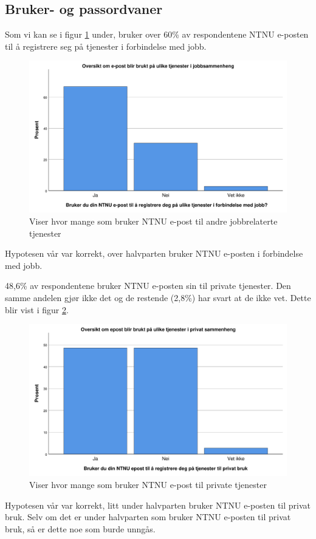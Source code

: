 \subsection{Bruker- og passordvaner}
Som vi kan se i figur \ref{fig:case2-epost-jobb} under, bruker over 60\% av respondentene NTNU e-posten til å registrere seg på tjenester i forbindelse med jobb.
\begin{figure}[H]
    \centering
    \includegraphics[scale=0.5]{case_2/bilder/spss/epost_jobb.pdf}
    \caption[E-post til jobbrelaterte tjenester]{Viser hvor mange som bruker NTNU e-post til andre jobbrelaterte tjenester}
    \label{fig:case2-epost-jobb}
\end{figure}
Hypotesen vår var korrekt, over halvparten bruker NTNU e-posten i forbindelse med jobb. 

48,6\% av respondentene bruker NTNU e-posten sin til private tjenester. Den samme andelen gjør ikke det og de restende (2,8\%) har svart at de ikke vet. Dette blir vist i figur \ref{fig:case2-epost-privat}.
\begin{figure}[H]
    \centering
    \includegraphics[scale=0.5]{case_2/bilder/spss/epost_privat.pdf}
    \caption[E-post til private tjenester]{Viser hvor mange som bruker NTNU e-post til private tjenester}
    \label{fig:case2-epost-privat}
\end{figure}
Hypotesen vår var korrekt, litt under halvparten bruker NTNU e-posten til privat bruk. Selv om det er under halvparten som bruker NTNU e-posten til privat bruk, så er dette noe som burde unngås. 

